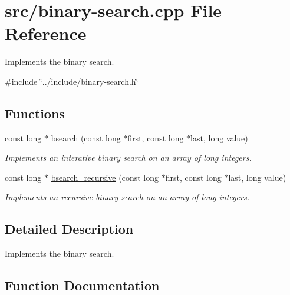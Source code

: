 \hypertarget{binary-search_8cpp}{}\section{src/binary-\/search.cpp File Reference}
\label{binary-search_8cpp}


Implements the binary search.  


{\ttfamily \#include \char`\"{}../include/binary-\/search.\+h\char`\"{}}\newline
\subsection*{Functions}
\begin{DoxyCompactItemize}
\item 
const long $\ast$ \mbox{\hyperlink{binary-search_8cpp_a20826c3f30778820b4c09cc75c30bfab}{bsearch}} (const long $\ast$first, const long $\ast$last, long value)
\begin{DoxyCompactList}\small\item\em Implements an interative binary search on an array of long integers. \end{DoxyCompactList}\item 
const long $\ast$ \mbox{\hyperlink{binary-search_8cpp_a9d68880223de2f3819bffee36f8486a5}{bsearch\+\_\+recursive}} (const long $\ast$first, const long $\ast$last, long value)
\begin{DoxyCompactList}\small\item\em Implements an recursive binary search on an array of long integers. \end{DoxyCompactList}\end{DoxyCompactItemize}


\subsection{Detailed Description}
Implements the binary search. 



\subsection{Function Documentation}
\mbox{\label{binary-search_8cpp_a20826c3f30778820b4c09cc75c30bfab}} 
